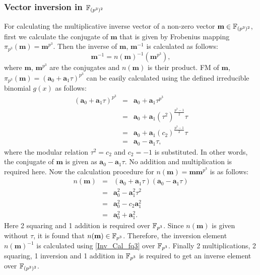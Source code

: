\subsubsection{Vector inversion in $\mathbb{F}_{(p^3)^2}$}
For calculating the multiplicative inverse vector of a non-zero vector $\textbf{m}\in \mathbb{F}_{(p^3)^2}$, first we calculate the conjugate of $\textbf{m}$ that is given by  Frobenius mapping  $\pi_{p^3}(\textbf{m}) = \textbf{m}^{p^3}$. Then the inverse of $\textbf{m}$, $\textbf{m}^{-1}$ is calculated as follows:
\begin{equation}\label{InvCal_fq_3_2}
\textbf{m}^{-1} = n(\textbf{m})^{-1}(\textbf{m}^{p^3}), 
\end{equation}
where  $\textbf{m}$, $\textbf{m}^{p^3}$ are the conjugates and $n(\textbf{m})$ is their product. FM of $\textbf{m}$, $\pi_{p^3}(\textbf{m}) =  (\textbf{a}_0+\textbf{a}_1\tau)^{p^3}$ can be easily calculated using the defined irreducible binomial $g(x)$ as follows:
\begin{eqnarray}\label{eq:FM_fq_3_2}
(\textbf{a}_0+\textbf{a}_1\tau)^{p^3} & = & \textbf{a}_0+\textbf{a}_1\tau^{p^3} \nonumber \\
& = & \textbf{a}_0+\textbf{a}_1(\tau^2)^{\frac{p^3-1}{2}}\tau \nonumber \\ 
& = & \textbf{a}_0+\textbf{a}_1(c_2)^{\frac{p^3-1}{2}}\tau \nonumber \\
& = & \textbf{a}_0-\textbf{a}_1\tau,
\end{eqnarray}
where the modular relation $\tau^2 = c_2 $ and $c_2 = -1$ is substituted. In other words, the conjugate of $\textbf{m}$ is given as $\textbf{a}_0-\textbf{a}_1\tau$. No addition and multiplication is required here. Now the calculation procedure for $n(\textbf{m}) = \textbf{m}\textbf{m}^{p^3}$ is as follows:
\begin{eqnarray}\label{eq:Inversion}
n(\textbf{m}) & = & (\textbf{a}_0+\textbf{a}_1\tau)(\textbf{a}_0 -\textbf{a}_1\tau)\nonumber\\
& = & \textbf{a}_0^2 - \textbf{a}_1^2\tau^2 \nonumber \\ 
& = & \textbf{a}_0^2 - c_2\textbf{a}_1^2 \nonumber \\ 
& = & \textbf{a}_0^2 + \textbf{a}_1^2.
\end{eqnarray}
Here 2 squaring and 1 addition is required over $\mathbb{F}_{p^3}$. Since $n(\textbf{m})$ is given without $\tau$, it is found that $n(\textbf{m}) \in {\mathbb{F}}_{p^{3}}$. Therefore, the inversion element  $n(\textbf{m})^{-1}$ is calculated using \eqref{Inv_Cal_fq3}  over $\mathbb{F}_{p^3}$. Finally 2 multiplications, 2 squaring, 1 inversion and 1 addition in $\mathbb{F}_{p^3}$ is required to get an inverse element over $\mathbb{F}_{(p^3)^2}$.

